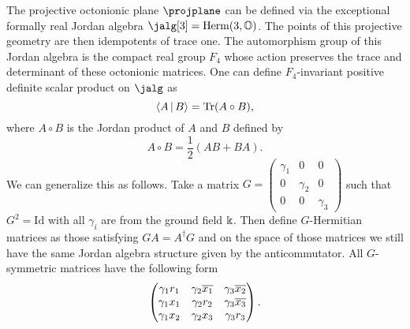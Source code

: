 The projective octonionic plane $\projplane$ can be defined via the exceptional formally real Jordan algebra $\jalg[3] = \mathrm{Herm}(3,\octo)$. The points of this projective geometry are then idempotents of trace one. The automorphism group of this Jordan algebra is the compact real group $F_4$ whose action preserves the trace and determinant of these octonionic matrices. One can define $F_4$-invariant positive definite scalar product on $\jalg$ as
\[
 \langle A\,|\, B \rangle = \mathrm{Tr}(A \circ B),
\]
where $A \circ B$ is the Jordan product of $A$ and $B$ defined by
\[
 A \circ B = \frac{1}{2} \left( AB + BA \right).
\]
We can generalize this as follows. Take a matrix $G=\begin{pmatrix} \gamma_1 & 0 & 0 \\ 0 & \gamma_2 & 0 \\ 0 & 0 & \gamma_3\end{pmatrix}$ such that $G^2 = \mathrm{Id}$ with all $\gamma_i$ are from the ground field $\Bbbk$. Then define $G$-Hermitian matrices as those satisfying $GA = A^\dagger G$ and on the space of those matrices we still have the same Jordan algebra structure given by the anticommutator. All $G$-symmetric matrices have the following form
\begin{equation}\label{g-matrix}
  \begin{pmatrix}
  \gamma_1 r_1 & \gamma_2 \overline{x_1} & \gamma_3 \overline{x_2} \\
  \gamma_1 x_1 & \gamma_2 r_2 & \gamma_3 \overline{x_3} \\
  \gamma_1 x_2 & \gamma_2 x_3 & \gamma_3 r_3
  \end{pmatrix}.
\end{equation}

